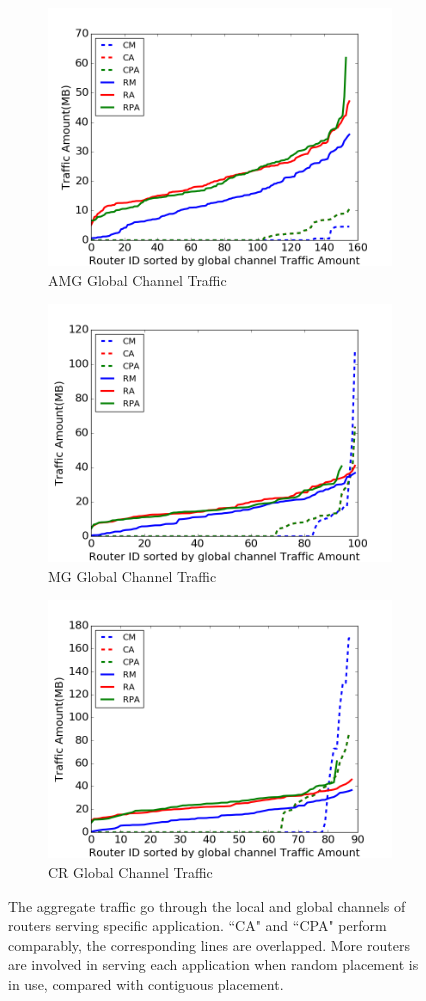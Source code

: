 \documentclass[conference,compsoc]{IEEEtran}
\begin{document}
\begin{figure}[t]
\begin{subfigure}[t]{0.32\textwidth}
        \includegraphics[height=1.8 in]{wkld/amg/gc-traffic}
        \caption{AMG Global Channel Traffic}
        \label{fig:amg-gc-traffic}
    \end{subfigure}\hfill
    \hspace{1em}%
    \begin{subfigure}[t]{0.32\textwidth}
        \centering
        \includegraphics[height=1.8 in]{wkld/mg/gc-traffic}
        \caption{MG Global Channel Traffic}
        \label{fig:mg-gc-traffic}
    \end{subfigure}\hfill
    \begin{subfigure}[t]{0.32\textwidth}
        \centering
        \includegraphics[height=1.8 in]{wkld/cr/gc-traffic}
        \caption{CR Global Channel Traffic}
        \label{fig:cr-gc-traffic}
    \end{subfigure}%
   \caption{The aggregate traffic go through the local and global channels of routers serving specific application. ``CA" and ``CPA" perform comparably, the corresponding lines are overlapped. More routers are involved in serving each application when random placement is in use, compared with contiguous placement.}
   \label{fig:3app-lc-gc-traffic}
\end{figure}
\end{document}
